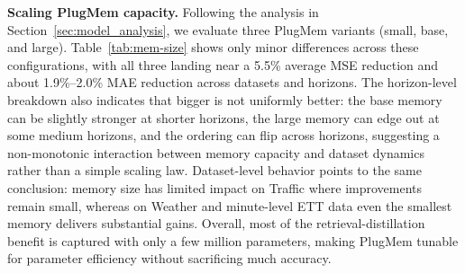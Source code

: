 \noindent\textbf{Scaling PlugMem capacity.}
Following the analysis in Section~\ref{sec:model_analysis}, we evaluate three PlugMem variants (small, base, and large). Table~\ref{tab:mem-size} shows only minor differences across these configurations, with all three landing near a 5.5\% average MSE reduction and about 1.9\%--2.0\% MAE reduction across datasets and horizons. The horizon-level breakdown also indicates that bigger is not uniformly better: the base memory can be slightly stronger at shorter horizons, the large memory can edge out at some medium horizons, and the ordering can flip across horizons, suggesting a non-monotonic interaction between memory capacity and dataset dynamics rather than a simple scaling law. Dataset-level behavior points to the same conclusion: memory size has limited impact on Traffic where improvements remain small, whereas on Weather and minute-level ETT data even the smallest memory delivers substantial gains. Overall, most of the retrieval-distillation benefit is captured with only a few million parameters, making PlugMem tunable for parameter efficiency without sacrificing much accuracy.









